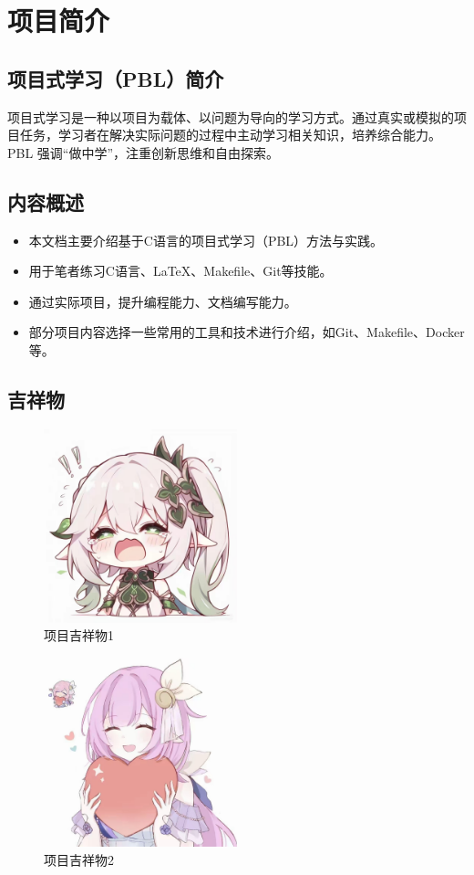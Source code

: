 \chapter{项目简介}

\section{项目式学习（PBL）简介}

项目式学习是一种以项目为载体、以问题为导向的学习方式。通过真实或模拟的项目任务，学习者在解决实际问题的过程中主动学习相关知识，培养综合能力。PBL 强调“做中学”，注重创新思维和自由探索。


\section{内容概述}

\begin{itemize}
    \item 本文档主要介绍基于C语言的项目式学习（PBL）方法与实践。
    \item 用于笔者练习C语言、\LaTeX、Makefile、Git等技能。
    \item 通过实际项目，提升编程能力、文档编写能力。
    \item 部分项目内容选择一些常用的工具和技术进行介绍，如Git、Makefile、Docker等。
\end{itemize}

\section{吉祥物}

\begin{figure}[htbp]
    \centering
    \includegraphics[width=0.5\textwidth]{images/1_4_xcs.jpg}
    \caption{项目吉祥物1}
    \label{fig:mascot}
\end{figure}

\begin{figure}
    \centering
    \includegraphics[width=0.5\textwidth]{images/1_4_xibr.jpg}
    \caption{项目吉祥物2}
    \label{fig:mascot2}
\end{figure}